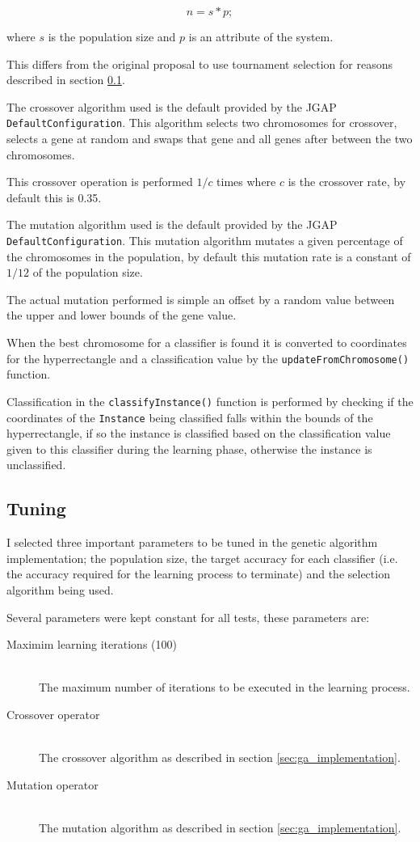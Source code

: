 \documentclass[a4paper]{article}
\begin{document}
\[
  n = s * p;
\]

where $s$ is the population size and $p$ is an attribute of the system.

This differs from the original proposal to use tournament selection for reasons
described in section \ref{sec:ga_tuning}.

The crossover algorithm used is the default provided by the JGAP
\texttt{DefaultConfiguration}. This algorithm selects two chromosomes for
crossover, selects a gene at random and swaps that gene and all genes after
between the two chromosomes.

This crossover operation is performed $1/c$ times where $c$ is the crossover
rate, by default this is 0.35.

The mutation algorithm used is the default provided by the JGAP
\texttt{DefaultConfiguration}. This mutation algorithm mutates a given
percentage of the chromosomes in the population, by default this mutation rate
is a constant of $1/12$ of the population size.

The actual mutation performed is simple an offset by a random value between the
upper and lower bounds of the gene value.

When the best chromosome for a classifier is found it is converted to
coordinates for the hyperrectangle and a classification value by the
\texttt{updateFromChromosome()} function.

Classification in the \texttt{classifyInstance()} function is performed by
checking if the coordinates of the \texttt{Instance} being classified falls
within the bounds of the hyperrectangle, if so the instance is classified based
on the classification value given to this classifier during the learning phase,
otherwise the instance is unclassified.

\subsection{Tuning}
\label{sec:ga_tuning}

I selected three important parameters to be tuned in the genetic algorithm
implementation; the population size, the target accuracy for each classifier
(i.e. the accuracy required for the learning process to terminate) and the
selection algorithm being used.

Several parameters were kept constant for all tests, these parameters are:

\begin{description}
  \item[Maximim learning iterations (100)] \hfill \\
    The maximum number of iterations to be executed in the learning process.
  \item[Crossover operator] \hfill \\
    The crossover algorithm as described in section \ref{sec:ga_implementation}.
  \item[Mutation operator] \hfill \\
    The mutation algorithm as described in section \ref{sec:ga_implementation}.
\end{description}
\end{document}
